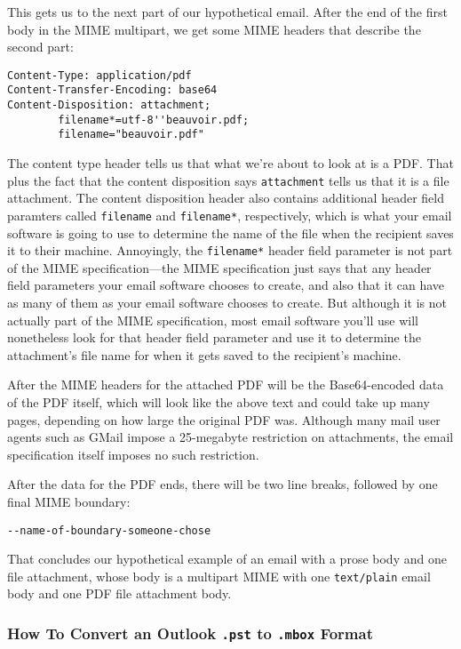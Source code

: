 \documentclass[11pt]{article}
\begin{document}
This gets us to the next part of our hypothetical email.  After the
end of the first body in the MIME multipart, we get some MIME headers
that describe the second part:

\begin{verbatim}
Content-Type: application/pdf
Content-Transfer-Encoding: base64
Content-Disposition: attachment; 
        filename*=utf-8''beauvoir.pdf;
        filename="beauvoir.pdf"
\end{verbatim}

The content type header tells us that what we're about to look at is a
PDF.  That plus the fact that the content disposition says
\texttt{attachment} tells us that it is a file attachment.  The content
disposition header also contains additional header field paramters
called \texttt{filename} and \texttt{filename*}, respectively, which is what your
email software is going to use to determine the name of the file when
the recipient saves it to their machine.  Annoyingly, the \texttt{filename*}
header field parameter is not part of the MIME specification---the
MIME specification just says that any header field parameters your
email software chooses to create, and also that it can have as many of
them as your email software chooses to create.  But although it is not
actually part of the MIME specification, most email software you'll
use will nonetheless look for that header field parameter and use it
to determine the attachment's file name for when it gets saved to the
recipient's machine.

After the MIME headers for the attached PDF will be the Base64-encoded
data of the PDF itself, which will look like the above text and could
take up many pages, depending on how large the original PDF was.
Although many mail user agents such as GMail impose a 25-megabyte
restriction on attachments, the email specification itself imposes no
such restriction.

After the data for the PDF ends, there will be two line breaks,
followed by one final MIME boundary:

\begin{verbatim}
--name-of-boundary-someone-chose
\end{verbatim}

That concludes our hypothetical example of an email with a prose body
and one file attachment, whose body is a multipart MIME with one
\texttt{text/plain} email body and one PDF file attachment body.

\subsubsection{How To Convert an Outlook \texttt{.pst} to \texttt{.mbox} Format}
\label{sec:org3035ffb}
\end{document}
